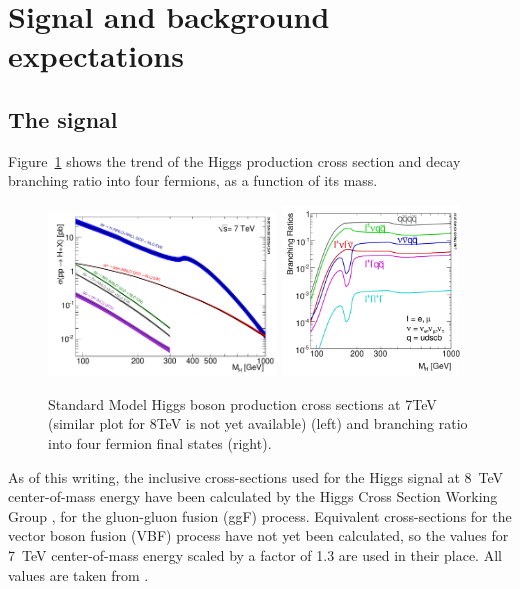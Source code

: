 \section{Signal and background expectations}
\label{sec:MCexpectations}


\subsection {The signal}


Figure~\ref{fig:higgsXSBR} shows the trend of the Higgs production cross section and decay branching ratio into four fermions, 
as a function of its mass.
%
\begin{figure}[htb] 
  {\centering
    \includegraphics[width=0.54\textwidth]{plots/limitplot/Higgs_XS_7TeV.pdf}
    \includegraphics[width=0.42\textwidth]{plots/limitplot/Higgs_BR_4fermion_1.pdf}
    \caption{Standard Model Higgs boson production cross sections at 7TeV (similar plot for 8TeV is not yet available) (left) and branching ratio into four fermion final states (right).}
    \label{fig:higgsXSBR}}
\end{figure}
%
As of this writing, the inclusive cross-sections used for the Higgs
signal at 8~TeV center-of-mass energy have been calculated by the
Higgs Cross Section Working Group
\cite{LHCHiggsCrossSectionWorkingGroup:2011ti},\cite{Dittmaier:2012vm}
for the gluon-gluon fusion (ggF) process. Equivalent cross-sections for the
vector boson fusion (VBF) process have not yet been calculated, so the
values for 7~TeV center-of-mass energy scaled by a factor of 1.3 are
used in their place. All values are taken from \cite{cite:higgsxsecbr}.


